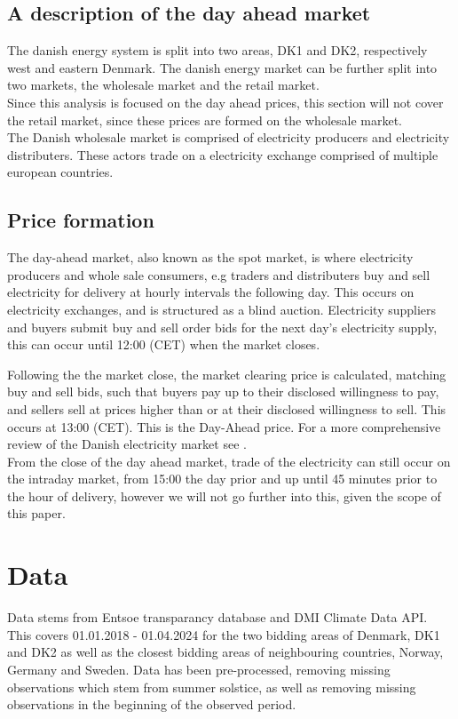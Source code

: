 \documentclass[10pt,a4paper]{article}
\numberwithin{equation}{section} %
\begin{document}
\subsection{A description of the day ahead market}
The danish energy system is split into two areas, DK1 and DK2, respectively west and eastern Denmark.
The danish energy market can be further split into two markets, the wholesale market and the retail market.\\
Since this analysis is focused on the day ahead prices, this section will not cover the retail market, since these prices are formed on the wholesale market.\\
The Danish wholesale market is comprised of electricity producers and electricity distributers. These actors
trade on a electricity exchange comprised of multiple european countries.
\subsection{Price formation}
The day-ahead market, also known as the spot market, is where electricity producers and whole sale consumers, e.g traders and distributers buy and sell electricity for delivery at hourly intervals the following day. This occurs on electricity exchanges, and is structured as a blind auction.
Electricity suppliers and buyers submit buy and sell order bids for the next day's electricity supply, this can occur until 12:00 (CET) when the market closes. 

Following the the market close, the market clearing price is calculated, matching buy and sell bids, such that buyers pay up to their disclosed willingness to pay, and sellers sell at prices higher than or at their disclosed willingness to sell. 
This occurs at 13:00 (CET). This is the Day-Ahead price. For a more comprehensive review of the Danish electricity market see \cite{Energinet2019}.\\
From the close of the day ahead market, trade of the electricity can still occur on the intraday market, from 15:00 the day prior and up until 45 minutes prior to the hour of delivery, however we will not go further into this, given the scope of this paper. 

\section{Data}
Data stems from Entsoe transparancy database and DMI Climate Data API. This covers 01.01.2018 - 01.04.2024 for the two bidding areas of Denmark, DK1 and DK2 as well as the closest bidding areas of neighbouring countries, Norway, Germany and Sweden.
Data has been pre-processed, removing missing observations which stem from summer solstice, as well as removing missing observations in the beginning of the observed period.
\end{document}

